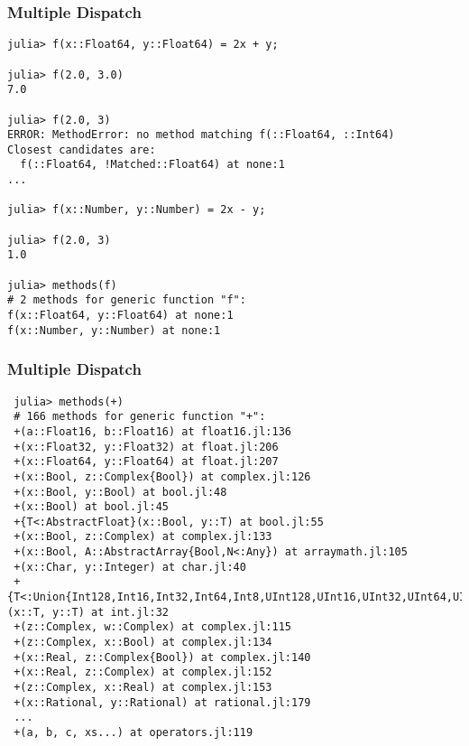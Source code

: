 \begin{frame}[fragile]
	\frametitle{Multiple Dispatch}
  \begin{tiny}
  \begin{verbatim}
julia> f(x::Float64, y::Float64) = 2x + y;

julia> f(2.0, 3.0)
7.0

julia> f(2.0, 3)
ERROR: MethodError: no method matching f(::Float64, ::Int64)
Closest candidates are:
  f(::Float64, !Matched::Float64) at none:1
...

julia> f(x::Number, y::Number) = 2x - y;

julia> f(2.0, 3)
1.0

julia> methods(f)
# 2 methods for generic function "f":
f(x::Float64, y::Float64) at none:1
f(x::Number, y::Number) at none:1
  \end{verbatim}
  \end{tiny}
\end{frame}


\begin{frame}[fragile]
	\frametitle{Multiple Dispatch}
  \begin{tiny}
  \begin{verbatim}
 julia> methods(+)
 # 166 methods for generic function "+":
 +(a::Float16, b::Float16) at float16.jl:136
 +(x::Float32, y::Float32) at float.jl:206
 +(x::Float64, y::Float64) at float.jl:207
 +(x::Bool, z::Complex{Bool}) at complex.jl:126
 +(x::Bool, y::Bool) at bool.jl:48
 +(x::Bool) at bool.jl:45
 +{T<:AbstractFloat}(x::Bool, y::T) at bool.jl:55
 +(x::Bool, z::Complex) at complex.jl:133
 +(x::Bool, A::AbstractArray{Bool,N<:Any}) at arraymath.jl:105
 +(x::Char, y::Integer) at char.jl:40
 +{T<:Union{Int128,Int16,Int32,Int64,Int8,UInt128,UInt16,UInt32,UInt64,UInt8}}(x::T, y::T) at int.jl:32
 +(z::Complex, w::Complex) at complex.jl:115
 +(z::Complex, x::Bool) at complex.jl:134
 +(x::Real, z::Complex{Bool}) at complex.jl:140
 +(x::Real, z::Complex) at complex.jl:152
 +(z::Complex, x::Real) at complex.jl:153
 +(x::Rational, y::Rational) at rational.jl:179
 ...
 +(a, b, c, xs...) at operators.jl:119
  \end{verbatim}
  \end{tiny}
\end{frame}


